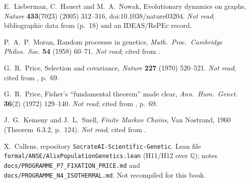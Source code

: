  E.~Lieberman, C.~Hauert and M.~A.~Nowak, Evolutionary dynamics on graphs, \emph{Nature}
\textbf{433}(7023) (2005) 312--316, doi:10.1038/nature03204. \emph{Not read}; bibliographic data from
\cite{ch4:KU} (p.~18) and an IDEAS/RePEc record.

 P.~A.~P.~Moran, Random processes in genetics, \emph{Math.\ Proc.\ Cambridge Philos.\ Soc.}
\textbf{54} (1958) 60--71. \emph{Not read}; cited from \cite{ch4:KU}.

 G.~R.~Price, Selection and covariance, \emph{Nature} \textbf{227} (1970) 520--521.
\emph{Not read}; cited from \cite{ch4:LaG}, p.~69.

 G.~R.~Price, Fisher's ``fundamental theorem'' made clear, \emph{Ann.\ Hum.\ Genet.}
\textbf{36}(2) (1972) 129--140. \emph{Not read}; cited from \cite{ch4:LaG}, p.~69.

 J.~G.~Kemeny and J.~L.~Snell, \emph{Finite Markov Chains}, Van Nostrand, 1960 (Theorem~6.3.2,
p.~124). \emph{Not read}; cited from \cite{ch4:PBRS}.

 X.~Callens, repository \texttt{SocrateAI-Scientific-Genetic}. Lean file
\texttt{formal/ANSE/}\allowbreak\texttt{AlixPopulation}\allowbreak\texttt{Genetics.lean} (H11/H12 over $\mathbb Q$);
notes \texttt{docs/}\allowbreak\texttt{PROGRAMME\_P7\_FIXATION\_PRICE.md} and
\texttt{docs/}\allowbreak\texttt{PROGRAMME\_N4\_ISOTHERMAL.md}. Not recompiled for this book.
